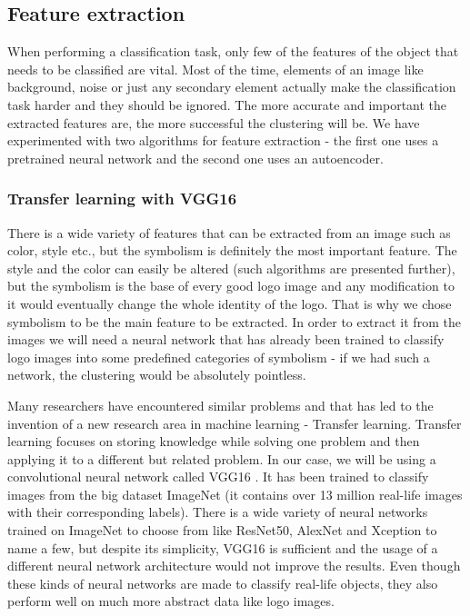 \documentclass{article}
\begin{document}
\subsection{Feature extraction}
When performing a classification task, only few of the features of the object that needs to be classified are vital. Most of the time, elements of an image like background, noise or just any secondary element actually make the classification task harder and they should be ignored. The more accurate and important the extracted features are, the more successful the clustering will be. We have experimented with two algorithms for feature extraction - the first one uses a pretrained neural network and the second one uses an autoencoder.

\subsubsection{Transfer learning with VGG16}
There is a wide variety of features that can be extracted from an image such as color, style etc., but the symbolism is definitely the most important feature. The style and the color can easily be altered (such algorithms are presented further), but the symbolism is the base of every good logo image and any modification to it would eventually change the whole identity of the logo. That is why we chose symbolism to be the main feature to be extracted. In order to extract it from the images we will need a neural network that has already been trained to classify logo images into some predefined categories of symbolism - if we had such a network, the clustering would be absolutely pointless.

Many researchers have encountered similar problems and that has led to the invention of a new research area in machine learning - Transfer learning. Transfer learning focuses on storing knowledge while solving one problem and then applying it to a different but related problem. In our case, we will be using a convolutional neural network called VGG16 \cite{simonyan2014deep}. It has been trained to classify images from the big dataset ImageNet (it contains over 13 million real-life images with their corresponding labels). There is a wide variety of neural networks trained on ImageNet to choose from like ResNet50, AlexNet and Xception to name a few, but despite its simplicity, VGG16 is sufficient and the usage of a different neural network architecture would not improve the results. Even though these kinds of neural networks are made to classify real-life objects, they also perform well on much more abstract data like logo images.
\end{document}
